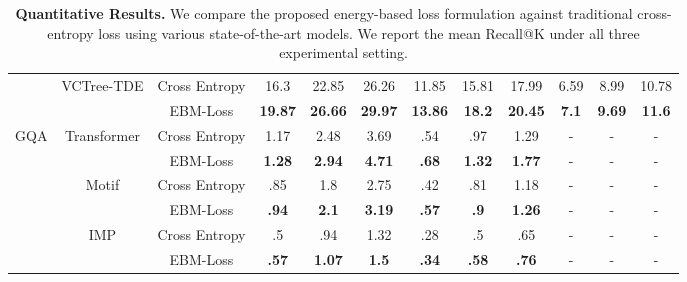 \documentclass[final]{cvpr}
\begin{document}
\begin{table*}[t]
{\begin{tabular}{@{}lccccccccccc@{}}
                                         & \multirow{2}{*}{VCTree-TDE \cite{tang2020unbiased}} & Cross Entropy & 16.3           & 22.85          & 26.26          & 11.85          & 15.81          & 17.99          & 6.59          & 8.99          & 10.78         \\
                                         &                                & EBM-Loss      & \textbf{19.87} & \textbf{26.66} & \textbf{29.97} & \textbf{13.86} & \textbf{18.2}  & \textbf{20.45} & \textbf{7.1}  & \textbf{9.69} & \textbf{11.6} \\ \midrule
\multicolumn{1}{c}{\multirow{6}{*}{GQA}} & \multirow{2}{*}{Transformer \cite{vaswani2017attention}}   & Cross Entropy & 1.17           & 2.48           & 3.69           & .54            & .97            & 1.29           & -             & -             & -             \\
\multicolumn{1}{c}{}                     &                                & EBM-Loss      & \textbf{1.28}  & \textbf{2.94}  & \textbf{4.71}  & \textbf{.68}   & \textbf{1.32}  & \textbf{1.77}  & -             & -             & -             \\ \cmidrule(l){2-12} 
\multicolumn{1}{c}{}                     & \multirow{2}{*}{Motif \cite{zellers2018neural}}         & Cross Entropy & .85            & 1.8            & 2.75           & .42            & .81            & 1.18           & -             & -             & -             \\
\multicolumn{1}{c}{}                     &                                & EBM-Loss      & \textbf{.94}   & \textbf{2.1}   & \textbf{3.19}  & \textbf{.57}   & \textbf{.9}    & \textbf{1.26}  & -             & -             & -             \\ \cmidrule(l){2-12} 
\multicolumn{1}{c}{}                     & \multirow{2}{*}{IMP \cite{xu2017scene}}           & Cross Entropy & .5             & .94            & 1.32           & .28            & .5             & .65            & -             & -             & -             \\
\multicolumn{1}{c}{}                     &                                & EBM-Loss      & \textbf{.57}   & \textbf{1.07}  & \textbf{1.5}   & \textbf{.34}   & \textbf{.58}   & \textbf{.76}   & -             & -             & -             \\ \bottomrule \bottomrule
\end{tabular}
}
\caption{{\bf Quantitative Results.} We compare the proposed energy-based loss formulation against traditional cross-entropy loss using various state-of-the-art models. We report the mean Recall@K \cite{tang2019learning} under all three experimental setting.}
\label{tabel:quantative_results}
\vspace{-0.1in}
\end{table*}
\end{document}
